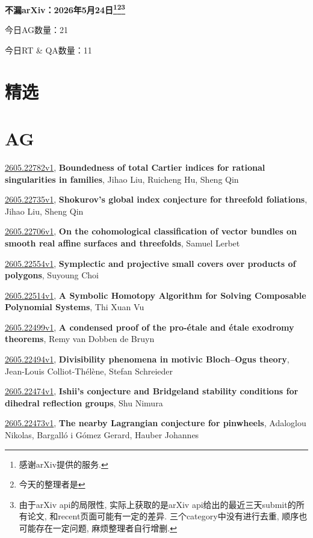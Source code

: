 \documentclass[9pt, a4paper]{article}
\theoremstyle{plain}
\theoremstyle{definition}
\theoremstyle{remark}
\newcommand{\arxiv}[3]{\href{https://arxiv.org/abs/#1}{#1}, \textbf{\textcolor{arxivblue}{#2}}, #3}
\newcommand{\AGnumber}{21}
\newcommand{\RTQAnumber}{11}
\newcommand{\NewestDate}{2026年5月24日}
\newcommand{\todayarXiver}{} %
\begin{document}
\begin{center}
    \Huge\textbf{不漏arXiv：\NewestDate\footnote{感谢arXiv提供的服务.}\footnote{今天的整理者是\todayarXiver}\footnote{由于arXiv api的局限性, 实际上获取的是arXiv api给出的最近三天submit的所有论文, 和recent页面可能有一定的差异. 三个category中没有进行去重, 顺序也可能存在一定问题, 麻烦整理者自行增删.}} \\
\end{center}

\setcounter{section}{-1}

\begin{center}
    今日AG数量：\AGnumber
    
    今日RT \& QA数量：\RTQAnumber
    
\end{center}


\section{精选}


\section{AG}
\arxiv{2605.22782v1}{Boundedness of total Cartier indices for rational singularities in families}{Jihao Liu, Ruicheng Hu, Sheng Qin}

\arxiv{2605.22735v1}{Shokurov's global index conjecture for threefold foliations}{Jihao Liu, Sheng Qin}

\arxiv{2605.22706v1}{On the cohomological classification of vector bundles on smooth real affine surfaces and threefolds}{Samuel Lerbet}

\arxiv{2605.22554v1}{Symplectic and projective small covers over products of polygons}{Suyoung Choi}

\arxiv{2605.22514v1}{A Symbolic Homotopy Algorithm for Solving Composable Polynomial Systems}{Thi Xuan Vu}

\arxiv{2605.22499v1}{A condensed proof of the pro-étale and étale exodromy theorems}{Remy van Dobben de Bruyn}

\arxiv{2605.22494v1}{Divisibility phenomena in motivic Bloch--Ogus theory}{Jean-Louis Colliot-Thélène, Stefan Schreieder}

\arxiv{2605.22474v1}{Ishii's conjecture and Bridgeland stability conditions for dihedral reflection groups}{Shu Nimura}

\arxiv{2605.22473v1}{The nearby Lagrangian conjecture for pinwheels}{Adaloglou Nikolas, Bargalló i Gómez Gerard, Hauber Johannes}
\end{document}
